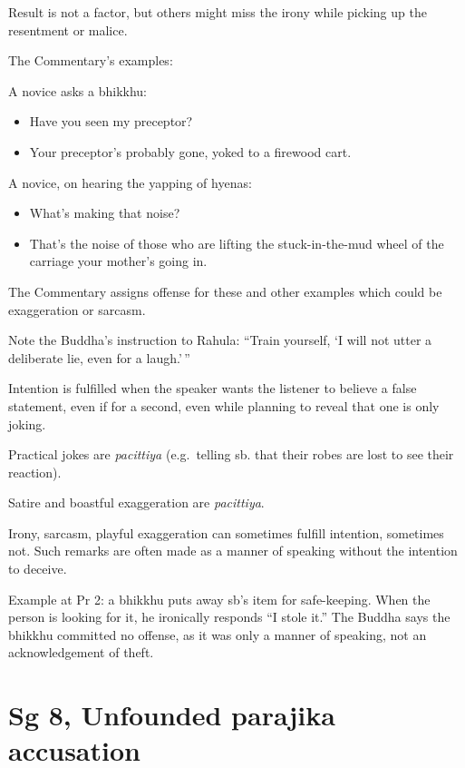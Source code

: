 Result is not a factor, but others might miss the irony while picking up
the resentment or malice.

The Commentary's examples:

A novice asks a bhikkhu:

\begin{itemize}
\tightlist
\item
  Have you seen my preceptor?
\item
  Your preceptor's probably gone, yoked to a firewood cart.
\end{itemize}

A novice, on hearing the yapping of hyenas:

\begin{itemize}
\tightlist
\item
  What's making that noise?
\item
  That's the noise of those who are lifting the stuck-in-the-mud wheel
  of the carriage your mother's going in.
\end{itemize}

The Commentary assigns offense for these and other examples which could
be exaggeration or sarcasm.

Note the Buddha's instruction to Rahula: ``Train yourself, `I will not
utter a deliberate lie, even for a laugh.'\,''

Intention is fulfilled when the speaker wants the listener to believe a
false statement, even if for a second, even while planning to reveal
that one is only joking.

Practical jokes are \emph{pacittiya} (e.g.~telling sb. that their robes
are lost to see their reaction).

Satire and boastful exaggeration are \emph{pacittiya}.

Irony, sarcasm, playful exaggeration can sometimes fulfill intention,
sometimes not. Such remarks are often made as a manner of speaking
without the intention to deceive.

Example at Pr 2: a bhikkhu puts away sb's item for safe-keeping. When
the person is looking for it, he ironically responds ``I stole it.'' The
Buddha says the bhikkhu committed no offense, as it was only a manner of
speaking, not an acknowledgement of theft.

\section{Sg 8, Unfounded parajika accusation}


